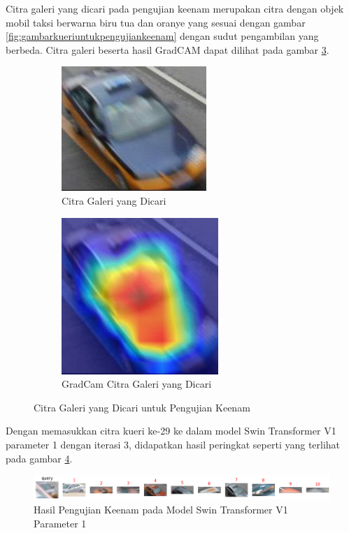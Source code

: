 Citra galeri yang dicari pada pengujian keenam merupakan citra dengan objek mobil taksi berwarna biru tua 
dan oranye yang sesuai dengan gambar \ref{fig:gambarkueriuntukpengujiankeenam} dengan sudut pengambilan yang berbeda. 
Citra galeri beserta hasil GradCAM dapat dilihat pada gambar \ref{fig:gambargaleriuntukpengujiankeenam}.

\begin{figure}[h!]
  \centering
  \begin{subfigure}{.5\textwidth}
    \centering
    \includegraphics[width=.4\linewidth]{gambar/Gal29_1060.jpg}
    \caption{Citra Galeri yang Dicari}
    \label{gambargalerinomorduasembilan}
  \end{subfigure}%
  \begin{subfigure}{.5\textwidth}
    \centering
    \includegraphics[width=.4\linewidth]{gambar/GradCamGal29_1060.jpg}
    \caption{GradCam Citra Galeri yang Dicari}
    \label{gradcamgambargalerinomorduasembilan}
  \end{subfigure}
  \caption{Citra Galeri yang Dicari untuk Pengujian Keenam}
  \label{fig:gambargaleriuntukpengujiankeenam}
\end{figure}

Dengan memasukkan citra kueri ke-29 ke dalam model Swin Transformer V1 parameter 1 dengan iterasi 3, didapatkan hasil 
peringkat seperti yang terlihat pada gambar \ref{fig:hasilpengujiankeenampadamodelswintransformerv1param1}.

\begin{figure}[h!]
  \centering
  \includegraphics[scale=0.6]{gambar/Que29V1P1IT3.png}
  \caption{Hasil Pengujian Keenam pada Model Swin Transformer V1 Parameter 1}
  \label{fig:hasilpengujiankeenampadamodelswintransformerv1param1}
\end{figure}

